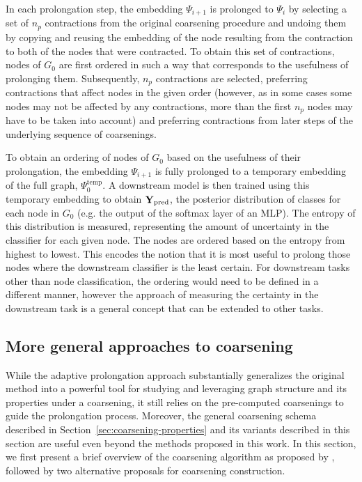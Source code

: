 In each prolongation step, the embedding \( \Psi_{i + 1} \) is prolonged to \( \Psi_i \) by selecting a set of \( n_p \) contractions from the original coarsening procedure and undoing them by copying and reusing the embedding of the node resulting from the contraction to both of the nodes that were contracted. To obtain this set of contractions, nodes of \( G_0 \) are first ordered in such a way that corresponds to the usefulness of prolonging them. Subsequently, \( n_p \) contractions are selected, preferring contractions that affect nodes in the given order (however, as in some cases some nodes may not be affected by any contractions, more than the first \( n_p \) nodes may have to be taken into account) and preferring contractions from later steps of the underlying sequence of coarsenings.

To obtain an ordering of nodes of \( G_0 \) based on the usefulness of their prolongation, the embedding \( \Psi_{i + 1} \) is fully prolonged to a temporary embedding of the full graph, \( \Psi_0^\mathrm{temp} \). A downstream model is then trained using this temporary embedding to obtain \( \mathbf{Y}_\mathrm{pred} \), the posterior distribution of classes for each node in \( G_0 \) (e.g. the output of the softmax layer of an MLP). The entropy of this distribution is measured, representing the amount of uncertainty in the classifier for each given node. The nodes are ordered based on the entropy from highest to lowest. This encodes the notion that it is most useful to prolong those nodes where the downstream classifier is the least certain. For downstream tasks other than node classification, the ordering would need to be defined in a different manner, however the approach of measuring the certainty in the downstream task is a general concept that can be extended to other tasks.

\subsection{More general approaches to coarsening}\label{sec:coarsening-algorithms}

While the adaptive prolongation approach substantially generalizes the original method into a powerful tool for studying and leveraging graph structure and its properties under a coarsening, it still relies on the pre-computed coarsenings to guide the prolongation process. Moreover, the general coarsening schema described in Section~\ref{sec:coarsening-properties} and its variants described in this section are useful even beyond the methods proposed in this work. In this section, we first present a brief overview of the coarsening algorithm as proposed by \cite{chen_harp_2018}, followed by two alternative proposals for coarsening construction.

